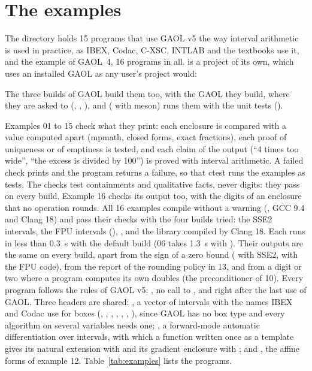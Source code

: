 \section{The examples}\label{sec:examples}
%

The directory  holds 15 programs that use GAOL v5 the way
interval arithmetic is used in practice, as IBEX, Codac, C-XSC, INTLAB and
the textbooks use it, and the example of GAOL~4, 16 programs in all.
is a project of its own, which uses an installed GAOL as any user's project
would:

\begin{cmdshell}
\end{cmdshell}

\noindent
The three builds of GAOL build them too, with the GAOL they build, where
they are asked to (, ,
), and  ( with meson)
runs them with the unit tests ().

\medskip
Examples 01 to 15 check what they print:\newinvfive{} each enclosure is
compared with a value computed apart (mpmath, closed forms, exact
fractions), each proof of uniqueness or of emptiness is tested, and each
claim of the output (``4 times too wide'', ``the excess is divided by 100'')
is proved with interval arithmetic. A failed check prints
 and the program returns a failure, so that ctest runs
the examples as tests. The checks test containments and qualitative facts,
never digits: they pass on every build. Example 16 checks its output too,
with the digits of an enclosure that no operation rounds. All 16 examples
compile without a warning (, GCC 9.4 and Clang 18)
and pass their checks with the four builds tried: the SSE2 intervals, the
FPU intervals (), ,
and the library compiled by Clang 18. Each runs in less than 0.3~s with the
default build (06 takes 1.3~s with ). Their
outputs are the same on every build, apart from the sign of a zero bound
(\code{[-0, 4]} with SSE2, \code{[0, 4]} with the FPU code), from the report
of the rounding policy in 13, and from a digit or two where a program
computes its own doubles (the preconditioner of 10). Every program follows
the rules of GAOL v5: , no call to
, and  right after the last use of
GAOL. Three headers are shared: , a vector of intervals with
the names IBEX and Codac use for boxes (,
, , ,
, \code{\&}, \code{|}), since GAOL has no box type
and every algorithm on several variables needs one; , a
forward-mode automatic differentiation over intervals, with which a function
written once as a template gives its natural extension with 
and its gradient enclosure with ; and , the
affine forms of example 12. Table~\ref{tab:examples} lists the programs.


